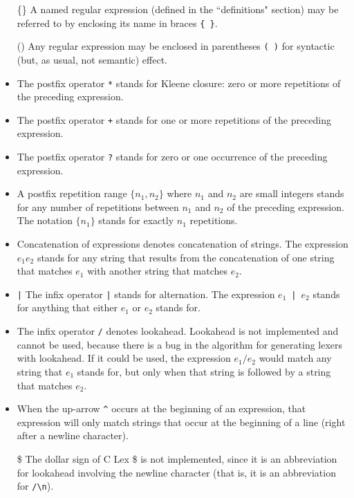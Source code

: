 \begin{itemize}
\item[\{\}]	A named regular expression (defined in the ``definitions"
	section) may be referred to by enclosing its name in
	braces \verb|{ }|.

\item[()] Any regular expression may be enclosed in parentheses \verb|( )|
	for syntactic (but, as usual, not semantic) effect.

\item[\verb|*|]	The postfix operator \verb|*| stands for Kleene closure:
	zero or more repetitions of the preceding expression.

\item[\verb|+|]	The postfix operator \verb|+| stands for one or more repetitions
	of the preceding expression.

\item[\verb|?|]	The postfix operator \verb|?| stands for zero or one occurrence of
	the preceding expression.

\item	A postfix repetition range $\{n_1,n_2\}$ where $n_1$ and $n_2$ are small
	integers stands for any number of repetitions between $n_1$ and $n_2$
	of the preceding expression.  The notation $\{n_1\}$ stands for
	exactly $n_1$ repetitions.

\item	Concatenation of expressions denotes concatenation of strings.
	The expression $e_1 e_2$ stands for any string that results from
	the concatenation of one string that matches $e_1$ with another
	string that matches $e_2$.

\item\verb-|-	The infix operator \verb-|- stands for alternation.  The expression
	$e_1$~\verb"|"~$e_2$  stands for anything that either $e_1$ or $e_2$ stands for.
    
\item[\verb|/|]	The infix operator \verb|/| denotes lookahead.  Lookahead is not
        implemented and cannot be used, because there is a bug
        in the algorithm for generating lexers with lookahead.  If
        it could be used, the expression $e_1 / e_2$ would match any string
        that $e_1$ stands for, but only when that string is followed by a
        string that matches $e_2$.

\item	When the up-arrow \verb|^| occurs at the beginning of an expression,
	that expression will only match strings that occur at the
	beginning of a line (right after a newline character).

\item[\$]   The dollar sign of C Lex \$ is not implemented, since it is an abbreviation
        for lookahead involving the newline character (that is, it
        is an abbreviation for \verb|/\n|).
\end{itemize}
	
